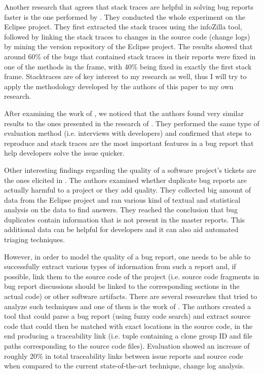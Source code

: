 \documentclass[11pt,english,twocolumn]{article}
\begin{document}
Another research that agrees that stack traces are helpful in solving bug
reports faster is the one performed by \cite{schroter2010stack}. They conducted
the whole experiment on the Eclipse project. They first extracted the stack
traces using the infoZilla tool\cite{bettenburg2008extracting}, followed by
linking the stack traces to changes in the source code (change logs) by mining
the version repository of the Eclipse project. The results showed that 
around 60\% of the bugs that contained stack traces in their reports were fixed
in one of the methods in the frame, with 40\% being fixed in exactly the first
stack frame. Stacktraces are of key interest to my research as well, thus I will 
try to apply the methodology developed by the authors of this paper to my
own research. 

After examining the work of \cite{bettenburg2007quality}, we noticed that
the authors found very similar results to the ones presented in the research 
of \cite{bettenburg2008makes}. They performed the same type of evaluation method (i.e. 
interviews with developers) and confirmed that steps to reproduce and stack traces
are the most important features in a bug report that help developers solve the
issue quicker.

Other interesting findings regarding the quality of a software project's tickets
are the ones elicited in \cite{bettenburg2008duplicate}. The authors examined
whether duplicate bug reports are actually harmful to a project or they add 
quality. They collected big amount of data from the Eclipse project and ran
various kind of textual and statistical analysis on the data to find answers.
They reached the conclusion that bug duplicates contain information that is not
present in the master reports. This additional data can be helpful for developers
and it can also aid automated triaging techniques.

However, in order to model the quality of a bug report, one needs to be able to
successfully extract various types of information from such a report and, if 
possible, link them to the source code of the project (i.e. source code fragments
in bug report discussions should be linked to the corresponding sections in the 
actual code) or other software artifacts. There are several researches that tried 
to analyze such techniques and one of them is the work of 
\cite{bettenburg2012using}. The authors created a tool that could parse a bug 
report (using fuzzy code search) and extract source code that could then be
matched with exact locations in the source code, in the end producing a 
traceability link (i.e. tuple containing a clone group ID and file paths 
corresponding to the source code files). Evaluation showed an increase of
roughly 20\% in total traceability links between issue reports and source code 
when compared to the current state-of-the-art technique, change log analysis.
\end{document}
